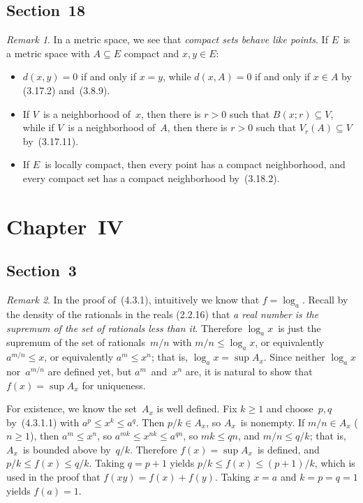 \documentclass[letterpaper,12pt]{article}
\theoremstyle{plain}
\theoremstyle{definition}
\theoremstyle{remark}
\newtheorem*{rmk}{Remark}
\begin{document}
\subsection*{Section~18}
\begin{rmk}
In a metric space, we see that \emph{compact sets behave like points}. If \(E\)~is a metric space with \(A\subseteq E\) compact and \(x,y\in E\):
\begin{itemize}[itemsep=0pt]
\item \(d(x,y)=0\) if and only if \(x=y\), while \(d(x,A)=0\) if and only if \(x\in A\) by (3.17.2) and~(3.8.9).
\item If \(V\)~is a neighborhood of~\(x\), then there is \(r>0\) such that \(B(x;r)\subseteq V\), while if \(V\)~is a neighborhood of~\(A\), then there is \(r>0\) such that \(V_r(A)\subseteq V\) by~(3.17.11).
\item If \(E\)~is locally compact, then every point has a compact neighborhood, and every compact set has a compact neighborhood by~(3.18.2).
\end{itemize}
\end{rmk}

\section*{Chapter~IV}
\subsection*{Section~3}
\begin{rmk}
In the proof of~(4.3.1), intuitively we know that \(f=\log_a\). Recall by the density of the rationals in the reals (2.2.16) that \emph{a real number is the supremum of the set of rationals less than it}. Therefore \(\log_a x\)~is just the supremum of the set of rationals~\(m/n\) with \(m/n\le\log_a x\), or equivalently \(a^{m/n}\le x\), or equivalently \(a^m\le x^n\); that is, \(\log_a x=\sup A_x\). Since neither \(\log_a x\) nor~\(a^{m/n}\) are defined yet, but \(a^m\)~and~\(x^n\) are, it is natural to show that \(f(x)=\sup A_x\) for uniqueness.

For existence, we know the set~\(A_x\) is well defined. Fix \(k\ge 1\) and choose~\(p,q\) by~(4.3.1.1) with \(a^p\le x^k\le a^q\). Then \(p/k\in A_x\), so \(A_x\)~is nonempty. If \(m/n\in A_x\) (\(n\ge 1\)), then \(a^m\le x^n\), so \(a^{mk}\le x^{nk}\le a^{qn}\), so \(mk\le qn\), and \(m/n\le q/k\); that is, \(A_x\)~is bounded above by~\(q/k\). Therefore \(f(x)=\sup A_x\)~is defined, and \(p/k\le f(x)\le q/k\). Taking \(q=p+1\) yields \(p/k\le f(x)\le(p+1)/k\), which is used in the proof that \(f(xy)=f(x)+f(y)\). Taking \(x=a\) and \(k=p=q=1\) yields \(f(a)=1\).


\end{rmk}
\end{document}
